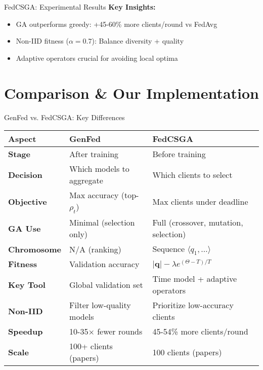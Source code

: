 \documentclass{beamer}
\begin{document}
\begin{frame}{FedCSGA: Experimental Results}
\vspace{0.2cm}
\textbf{Key Insights:}
\begin{itemize}
\item GA outperforms greedy: +45-60\% more clients/round vs FedAvg
\item Non-IID fitness ($\alpha=0.7$): Balance diversity + quality
\item Adaptive operators crucial for avoiding local optima
\end{itemize}
\end{frame}

\section{Comparison \& Our Implementation}

\begin{frame}{GenFed vs. FedCSGA: Key Differences}
\begin{table}
\centering
\tiny
\begin{tabular}{|l|p{4cm}|p{4cm}|}
\hline
\textbf{Aspect} & \textbf{GenFed} & \textbf{FedCSGA} \\
\hline
\textbf{Stage} & After training & Before training \\
\textbf{Decision} & Which models to aggregate & Which clients to select \\
\textbf{Objective} & Max accuracy (top-$\rho_t$) & Max clients under deadline \\
\textbf{GA Use} & Minimal (selection only) & Full (crossover, mutation, selection) \\
\textbf{Chromosome} & N/A (ranking) & Sequence $\langle q_1, \ldots \rangle$ \\
\textbf{Fitness} & Validation accuracy & $|\mathbf{q}| - \lambda e^{(\Theta-T)/T}$ \\
\textbf{Key Tool} & Global validation set & Time model + adaptive operators \\
\textbf{Non-IID} & Filter low-quality models & Prioritize low-accuracy clients \\
\textbf{Speedup} & 10-35× fewer rounds & 45-54\% more clients/round \\
\textbf{Scale} & 100+ clients (papers) & 100 clients (papers) \\
\hline
\end{tabular}
\end{table}
\end{frame}
\end{document}
